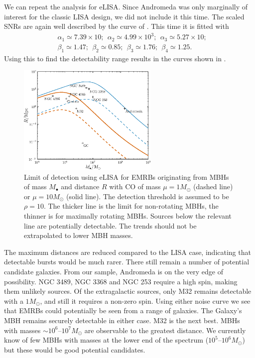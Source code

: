 We can repeat the analysis for eLISA. Since Andromeda was only marginally of interest for the classic LISA design, we did not include it this time. The scaled SNRs are again well described by the curve of . This time it is fitted with
\begin{equation}
\begin{split}
&\alpha_1 \simeq 7.39 \times 10; \ \  \alpha_2 \simeq 4.99 \times 10^3; \ \  \alpha_3 \simeq 5.27 \times 10;\\
&\beta_1 \simeq 1.47; \ \  \beta_2 \simeq 0.85; \ \  \beta_3 \simeq 1.76; \ \  \beta_4 \simeq 1.25.
\end{split}
\end{equation}
Using this to find the detectability range results in the curves shown in .
\begin{figure}[!htp]
\begin{center}
 \includegraphics[width=0.6\textwidth]{./images/Fig_M_R_detect_2}
 \caption{Limit of detection using eLISA for EMRBs originating from MBHs of mass $M_\bullet$ and distance $R$ with CO of mass $\mu = 1 M_\odot$ (dashed line) or $\mu = 10 M_\odot$ (solid line). The detection threshold is assumed to be $\rho = 10$. The thicker line is the limit for non-rotating MBHs, the thinner is for maximally rotating MBHs. Sources below the relevant line are potentially detectable. The trends should not be extrapolated to lower MBH masses.\label{fig:detect-eLISA}}
   \end{center}
\end{figure}
The maximum distances are reduced compared to the LISA case, indicating that detectable bursts would be much rarer. There still remain a number of potential candidate galaxies. From our sample, Andromeda is on the very edge of possibility. NGC 3489, NGC 3368 and NGC 253 require a high spin, making them unlikely sources. Of the extragalactic sources, only M32 remains detectable with a $1 M_\odot$, and still it requires a non-zero spin.
Using either noise curve we see that EMRBs could potentially be seen from a range of galaxies. The Galaxy's MBH remains securely detectable in either case. M32 is the next best. MBHs with masses $\sim 10^6$--$10^7 M_\odot$ are observable to the greatest distance. We currently know of few MBHs with masses at the lower end of the spectrum ($10^5$--$10^6 M_\odot$) but these would be good potential candidates.